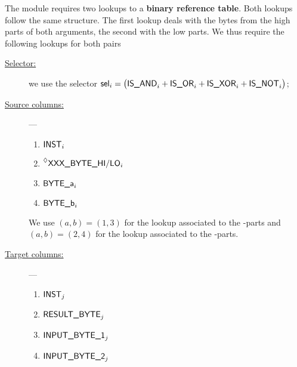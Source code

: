The \binMod{} module requires two lookups to a \textbf{binary reference table}.
Both lookups follow the same structure.
The first lookup deals with the bytes from the high parts of both arguments, the second with the low parts.
We thus require the following lookups for both pairs 
\begin{description}
	\item[\underline{Selector:}] we use the selector $\textsf{sel}_{i} = \big( \textsf{IS\_AND}_{i} + \textsf{IS\_OR}_{i} + \textsf{IS\_XOR}_{i} + \textsf{IS\_NOT}_{i} \big)$;
	\item[\underline{Source columns:}] ---
	\begin{multicols}{2}
		\begin{enumerate}
			\item $\textsf{INST}_{i}$
			\item $\prescript{\lozenge}{}{\textsf{XXX\_BYTE\_HI/LO}}_{i}$
			\item $\textsf{BYTE}\textsf{\_a}_{i}$
			\item $\textsf{BYTE}\textsf{\_b}_{i}$
		\end{enumerate}
	\end{multicols}
		\saNote{} We use $(a,b) = (1,3)$ for the lookup associated to the -parts and $(a,b) = (2,4)$ for the lookup associated to the -parts.
	\item[\underline{Target columns:}] ---
	\begin{multicols}{2}
		\begin{enumerate}
			\item $\textsf{INST}_{j}$
			\item $\textsf{RESULT\_BYTE}_{j}$
			\item $\textsf{INPUT\_BYTE\_1}_{j}$
			\item $\textsf{INPUT\_BYTE\_2}_{j}$
		\end{enumerate}
	\end{multicols}
\end{description}
